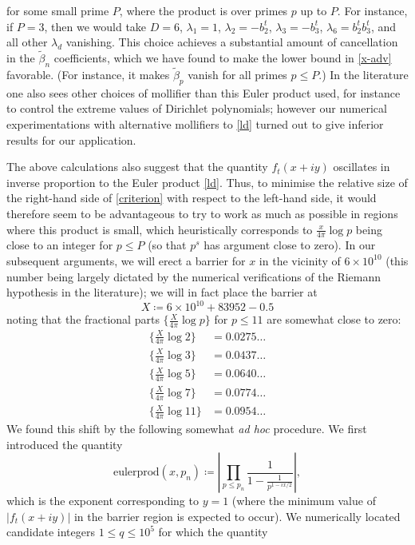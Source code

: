 for some small prime $P$, where the product is over primes $p$ up to $P$.  For instance, if $P = 3$, then we would take $D=6$, $\lambda_1 = 1$, $\lambda_2 = - b_2^t$, $\lambda_3 = -b_3^t$, $\lambda_6 = b_2^t b_3^t$, and all other $\lambda_d$ vanishing.  This choice achieves a substantial amount of cancellation in the $\tilde \beta_n$ coefficients, which we have found to make the lower bound in \eqref{x-adv} favorable.  (For instance, it makes $\tilde \beta_p$ vanish for all primes $p \leq P$.)  In the literature one also sees other choices of mollifier than this Euler product used, for instance to control the extreme values of Dirichlet polynomials; however our numerical experimentations with alternative mollifiers to \eqref{ld} turned out to give inferior results for our application.

The above calculations also suggest that the quantity $f_t(x+iy)$ oscillates in inverse proportion to the Euler product \eqref{ld}.  Thus, to minimise the relative size of the right-hand side of \eqref{criterion} with respect to the left-hand side, it would therefore seem to be advantageous to try to work as much as possible in regions where this product is small, which heuristically corresponds to $\frac{x}{4\pi} \log p$ being close to an integer for $p \leq P$ (so that $p^s$ has argument close to zero).  In our subsequent arguments, we will erect a barrier for $x$ in the vicinity of $6 \times 10^{10}$ (this number being largely dictated by the numerical verifications of the Riemann hypothesis in the literature); we will in fact place the barrier at
$$ X \coloneqq 6 \times 10^{10} + 83952 - 0.5$$
noting that the fractional parts $\{ \frac{X}{4\pi} \log p\}$ for $p \leq 11$ are somewhat close to zero:
\begin{align*}
\{ \frac{X}{4\pi} \log 2 \} &= 0.0275\dots \\
\{ \frac{X}{4\pi} \log 3 \} &= 0.0437\dots \\
\{ \frac{X}{4\pi} \log 5 \} &= 0.0640\dots \\
\{ \frac{X}{4\pi} \log 7 \} &= 0.0774\dots\\
\{ \frac{X}{4\pi} \log 11 \} &= 0.0954\dots
\end{align*}
We found this shift by the following somewhat \emph{ad hoc} procedure.  We first introduced the quantity
$$ \mathrm{eulerprod}(x,p_n) \coloneqq \left|\prod\limits_{p \leq p_n}\frac{1}{1-\frac{1}{p^{1-ix/2}}}\right|,$$
which is the  exponent corresponding to $y=1$ (where the minimum value of $|f_t(x+iy)|$ in the barrier region is expected to occur).  We numerically located candidate integers $1 \leq q \leq 10^5$ for which the quantity

